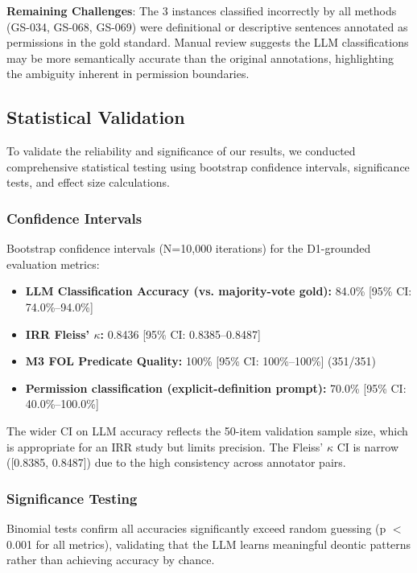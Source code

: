 \textbf{Remaining Challenges}: The 3 instances classified incorrectly by all methods (GS-034, GS-068, GS-069) were definitional or descriptive sentences annotated as permissions in the gold standard. Manual review suggests the LLM classifications may be more semantically accurate than the original annotations, highlighting the ambiguity inherent in permission boundaries.

\subsection{Statistical Validation}

To validate the reliability and significance of our results, we conducted comprehensive statistical testing using bootstrap confidence intervals, significance tests, and effect size calculations.

\subsubsection{Confidence Intervals}

Bootstrap confidence intervals (N=10,000 iterations) for the D1-grounded evaluation metrics:

\begin{itemize}
    \item \textbf{LLM Classification Accuracy (vs. majority-vote gold):} 84.0\% [95\% CI: 74.0\%--94.0\%]
    \item \textbf{IRR Fleiss' $\kappa$:} 0.8436 [95\% CI: 0.8385--0.8487]
    \item \textbf{M3 FOL Predicate Quality:} 100\% [95\% CI: 100\%--100\%] (351/351)
    \item \textbf{Permission classification (explicit-definition prompt):} 70.0\% [95\% CI: 40.0\%--100.0\%]
\end{itemize}

The wider CI on LLM accuracy reflects the 50-item validation sample size, which is appropriate for an IRR study but limits precision. The Fleiss' $\kappa$ CI is narrow ([0.8385, 0.8487]) due to the high consistency across annotator pairs.

\subsubsection{Significance Testing}

Binomial tests confirm all accuracies significantly exceed random guessing (p $<$ 0.001 for all metrics), validating that the LLM learns meaningful deontic patterns rather than achieving accuracy by chance.

